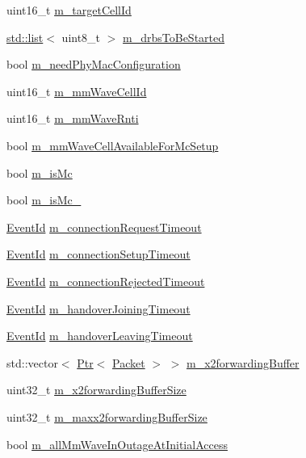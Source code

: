 \begin{DoxyCompactItemize}
\item 
uint16\+\_\+t \hyperlink{classns3_1_1UeManager_a8a70641b8dfb0641e6cfcf4cc83083a3}{m\+\_\+target\+Cell\+Id}
\item 
\hyperlink{openflow-interface_8h_afd9bcfa176617760671b67580f536fa7}{std\+::list}$<$ uint8\+\_\+t $>$ \hyperlink{classns3_1_1UeManager_a61c31c1ebd084eed264d06b92dd44920}{m\+\_\+drbs\+To\+Be\+Started}
\item 
bool \hyperlink{classns3_1_1UeManager_a2c655c5f3f0bdb4953405734118770df}{m\+\_\+need\+Phy\+Mac\+Configuration}
\item 
uint16\+\_\+t \hyperlink{classns3_1_1UeManager_a0f53cb816bd8a3ad6227dc9adca671b2}{m\+\_\+mm\+Wave\+Cell\+Id}
\item 
uint16\+\_\+t \hyperlink{classns3_1_1UeManager_a3d5cf7dc8a13b9e2616ecb9a70faebd3}{m\+\_\+mm\+Wave\+Rnti}
\item 
bool \hyperlink{classns3_1_1UeManager_ad0ab1d98110575774a2d4da876878ad2}{m\+\_\+mm\+Wave\+Cell\+Available\+For\+Mc\+Setup}
\item 
bool \hyperlink{classns3_1_1UeManager_a78958b4916253f7e2f9da8fd7f4662b6}{m\+\_\+is\+Mc}
\item 
bool \hyperlink{classns3_1_1UeManager_a1ff2a09ff4ed22e06fc86cb5ae614c83}{m\+\_\+is\+Mc\+\_}
\item 
\hyperlink{classns3_1_1EventId}{Event\+Id} \hyperlink{classns3_1_1UeManager_a85948121037b466cea1baa6a51273def}{m\+\_\+connection\+Request\+Timeout}
\item 
\hyperlink{classns3_1_1EventId}{Event\+Id} \hyperlink{classns3_1_1UeManager_afa30ea647e5d93b6c58d46b92e681044}{m\+\_\+connection\+Setup\+Timeout}
\item 
\hyperlink{classns3_1_1EventId}{Event\+Id} \hyperlink{classns3_1_1UeManager_a7071fcda6f71ed8382ae0144cfe61692}{m\+\_\+connection\+Rejected\+Timeout}
\item 
\hyperlink{classns3_1_1EventId}{Event\+Id} \hyperlink{classns3_1_1UeManager_a441fc4eda92a15be344d70b7039dacd4}{m\+\_\+handover\+Joining\+Timeout}
\item 
\hyperlink{classns3_1_1EventId}{Event\+Id} \hyperlink{classns3_1_1UeManager_aebe46172b4387024c856c6917b5e2d6b}{m\+\_\+handover\+Leaving\+Timeout}
\item 
std\+::vector$<$ \hyperlink{classns3_1_1Ptr}{Ptr}$<$ \hyperlink{classns3_1_1Packet}{Packet} $>$ $>$ \hyperlink{classns3_1_1UeManager_a3fb8a9dc6ef434306f90f42837f3ae83}{m\+\_\+x2forwarding\+Buffer}
\item 
uint32\+\_\+t \hyperlink{classns3_1_1UeManager_af9b888fa844a79c14b46c50ebae65031}{m\+\_\+x2forwarding\+Buffer\+Size}
\item 
uint32\+\_\+t \hyperlink{classns3_1_1UeManager_a06780ff70dbed84661ea3b1e0c06452c}{m\+\_\+maxx2forwarding\+Buffer\+Size}
\item 
bool \hyperlink{classns3_1_1UeManager_a311e1518759c74a51cbc56c568488ca1}{m\+\_\+all\+Mm\+Wave\+In\+Outage\+At\+Initial\+Access}
\end{DoxyCompactItemize}
